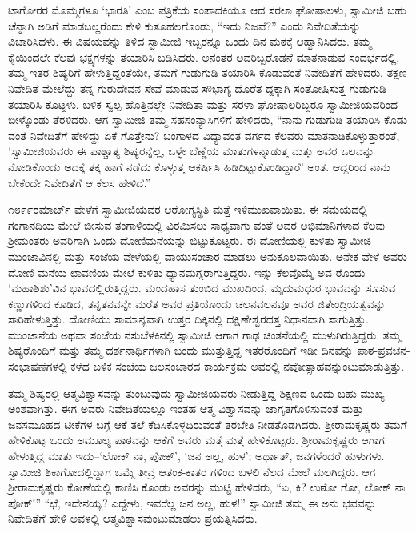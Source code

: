 ಟಾಗೋರರ ಮೊಮ್ಮಗಳೂ ‘ಭಾರತಿ’ ಎಂಬ ಪತ್ರಿಕೆಯ ಸಂಪಾದಕಿಯೂ ಆದ ಸರಲಾ ಘೋಷಾಲಳು, ಸ್ವಾಮೀಜಿ ಬಹು ಚೆನ್ನಾಗಿ ಅಡಿಗೆ ಮಾಡಬಲ್ಲರೆಂದು ಕೇಳಿ ಕುತೂಹಲಗೊಂಡು, “ಇದು ನಿಜವೆ?” ಎಂದು ನಿವೇದಿತೆಯನ್ನು ವಿಚಾರಿಸಿದಳು. ಈ ವಿಷಯವನ್ನು ತಿಳಿದ ಸ್ವಾಮೀಜಿ ಇಬ್ಬರನ್ನೂ ಒಂದು ದಿನ ಮಠಕ್ಕೆ ಆಹ್ವಾನಿಸಿದರು. ತಮ್ಮ ಕೈಯಿಂದಲೇ ಕೆಲವು ಭಕ್ಷ್ಯಗಳನ್ನು ತಯಾರಿಸಿ ಬಡಿಸಿದರು. ಅನಂತರ ಅವರಿಬ್ಬರೊಡನೆ ಮಾತನಾಡುವ ಸಂದರ್ಭದಲ್ಲಿ, ತಮ್ಮ ಇತರ ಶಿಷ್ಯರಿಗೆ ಹೇಳುತ್ತಿದ್ದಂತೆಯೇ, ತಮಗೆ ಗುಡುಗುಡಿ ತಯಾರಿಸಿ ಕೊಡುವಂತೆ ನಿವೇದಿತೆಗೆ ಹೇಳಿದರು. ತಕ್ಷಣ ನಿವೇದಿತೆ ಮೇಲೆದ್ದು ತನ್ನ ಗುರುದೇವನ ಸೇವೆ ಮಾಡುವ ಸೌಭಾಗ್ಯ ದೊರೆತ ದ್ದಕ್ಕಾಗಿ ಸಂತೋಷಿಸುತ್ತ ಗುಡುಗುಡಿ ತಯಾರಿಸಿ ಕೊಟ್ಟಳು. ಬಳಿಕ ಸ್ವಲ್ಪ ಹೊತ್ತಿನಲ್ಲೇ ನಿವೇದಿತಾ ಮತ್ತು ಸರಳಾ ಘೋಷಾಲರಿಬ್ಬರೂ ಸ್ವಾಮೀಜಿಯವರಿಂದ ಬೀಳ್ಕೊಂಡು ತೆರಳಿದರು. ಆಗ ಸ್ವಾಮೀಜಿ ತಮ್ಮ ಸಹಸಂನ್ಯಾಸಿಗಳಿಗೆ ಹೇಳಿದರು, “ನಾನು ಗುಡುಗುಡಿ ತಯಾರಿಸಿ ಕೊಡು ವಂತೆ ನಿವೇದಿತೆಗೆ ಹೇಳಿದ್ದು ಏಕೆ ಗೊತ್ತೇನು? ಬಂಗಾಳದ ವಿದ್ಯಾವಂತ ವರ್ಗದ ಕೆಲವರು ಮಾತನಾಡಿಕೊಳ್ಳುತ್ತಾರಂತೆ, ‘ಸ್ವಾಮೀಜಿಯವರು ಈ ಪಾಶ್ಚಾತ್ಯ ಶಿಷ್ಯರನ್ನೆಲ್ಲ, ಒಳ್ಳೇ ಬೆಣ್ಣೆಯ ಮಾತುಗಳನ್ನಾಡುತ್ತ ಮತ್ತು ಅವರ ಒಲವನ್ನು ನೋಡಿಕೊಂಡು ಅದಕ್ಕೆ ತಕ್ಕ ಹಾಗೆ ನಡೆದು ಕೊಳ್ಳುತ್ತ ಆಕರ್ಷಿಸಿ ಹಿಡಿದಿಟ್ಟುಕೊಂಡಿದ್ದಾರೆ’ ಅಂತ. ಆದ್ದರಿಂದ ನಾನು ಬೇಕೆಂದೇ ನಿವೇದಿತೆಗೆ ಆ ಕೆಲಸ ಹೇಳಿದೆ.”

೧೮೯೯ರಮಾರ್ಚ್ ವೇಳೆಗೆ ಸ್ವಾಮೀಜಿಯವರ ಆರೋಗ್ಯಸ್ಥಿತಿ ಮತ್ತೆ ಇಳಿಮುಖವಾಯಿತು. ಈ ಸಮಯದಲ್ಲಿ ಗಂಗಾನದಿಯ ಮೇಲೆ ಬೀಸುವ ತಂಗಾಳಿಯಲ್ಲಿ ವಿರಮಿಸಲು ಸಾಧ್ಯವಾಗು ವಂತೆ ಅವರ ಅಭಿಮಾನಿಗಳಾದ ಕೆಲವು ಶ್ರೀಮಂತರು ಅವರಿಗಾಗಿ ಒಂದು ದೋಣಿಮನೆಯನ್ನು ಬಿಟ್ಟುಕೊಟ್ಟರು. ಈ ದೋಣಿಯಲ್ಲಿ ಕುಳಿತು ಸ್ವಾಮೀಜಿ ಮುಂಜಾವಿನಲ್ಲಿ ಮತ್ತು ಸಂಜೆಯ ವೇಳೆಯಲ್ಲಿ ವಾಯುಸಂಚಾರ ಮಾಡಲು ಅನುಕೂಲವಾಯಿತು. ಅನೇಕ ವೇಳೆ ಅವರು ದೋಣಿ ಮನೆಯ ಛಾವಣಿಯ ಮೇಲೆ ಕುಳಿತು ಧ್ಯಾನಮಗ್ನರಾಗುತ್ತಿದ್ದರು. ಇನ್ನು ಕೆಲವೊಮ್ಮೆ ಅವ ರೊಂದು ‘ಮಹಾಶಿಶು’ವಿನ ಭಾವದಲ್ಲಿರುತ್ತಿದ್ದರು. ಮಂದಹಾಸ ತುಂಬಿದ ಮುಖದಿಂದ, ಮೃದುಮಧುರ ಭಾವವನ್ನು ಸೂಸುವ ಕಣ್ಣುಗಳಿಂದ ಕೂಡಿದ, ತನ್ನತನವನ್ನೇ ಮರೆತ ಅವರ ಪ್ರತಿಯೊಂದು ಚಲನವಲನವೂ ಅವರ ಜಿತೇಂದ್ರಿಯತ್ವವನ್ನು ಸಾರಿಹೇಳುತ್ತಿತ್ತು. ದೋಣಿಯು ಸಾಮಾನ್ಯವಾಗಿ ಉತ್ತರ ದಿಕ್ಕಿನಲ್ಲಿ ದಕ್ಷಿಣೇಶ್ವರದತ್ತ ನಿಧಾನವಾಗಿ ಸಾಗುತ್ತಿತ್ತು. ಮುಂಜಾನೆಯ ಅಥವಾ ಸಂಜೆಯ ನಸುಬೆಳಕಿನಲ್ಲಿ ಸ್ವಾಮೀಜಿ ಆಗಾಗ ಗಾಢ ಚಿಂತನೆಯಲ್ಲಿ ಮುಳುಗಿರುತ್ತಿದ್ದರು. ತಮ್ಮ ಶಿಷ್ಯರೊಂದಿಗೆ ಮತ್ತು ತಮ್ಮ ದರ್ಶನಾರ್ಥಿಗಳಾಗಿ ಬಂದು ಮುತ್ತುತ್ತಿದ್ದ ಇತರರೊಂದಿಗೆ ಇಡೀ ದಿನವನ್ನು ಪಾಠ-ಪ್ರವಚನ-ಸಂಭಾಷಣೆಗಳಲ್ಲಿ ಕಳೆದ ಬಳಿಕ ಸಂಜೆಯ ಜಲಸಂಚಾರದ ಕಾರ್ಯಕ್ರಮ ಅವರಲ್ಲಿ ನವೋತ್ಸಾಹವನ್ನುಂಟುಮಾಡುತ್ತಿತ್ತು.

ತಮ್ಮ ಶಿಷ್ಯರಲ್ಲಿ ಆತ್ಮವಿಶ್ವಾಸವನ್ನು ತುಂಬುವುದು ಸ್ವಾಮೀಜಿಯವರು ನೀಡುತ್ತಿದ್ದ ಶಿಕ್ಷಣದ ಒಂದು ಬಹು ಮುಖ್ಯ ಅಂಶವಾಗಿತ್ತು. ಈಗ ಅವರು ನಿವೇದಿತೆಯಲ್ಲೂ ಇಂತಹ ಆತ್ಮ ವಿಶ್ವಾಸವನ್ನು ಜಾಗೃತಗೊಳಿಸುವಂತೆ ಮತ್ತು ಜನಸಮೂಹದ ಟೀಕೆಗಳ ಬಗ್ಗೆ ಆಕೆ ತಲೆ ಕೆಡಿಸಿಕೊಳ್ಳದಿರುವಂತೆ ತರಬೇತಿ ನೀಡತೊಡಗಿದರು. ಶ್ರೀರಾಮಕೃಷ್ಣರು ತಮಗೆ ಹೇಳಿಕೊಟ್ಟ ಒಂದು ಅಮೂಲ್ಯ ಪಾಠವನ್ನು ಆಕೆಗೆ ಅವರು ಮತ್ತೆ ಮತ್ತೆ ಹೇಳಿಕೊಟ್ಟರು. ಶ್ರೀರಾಮಕೃಷ್ಣರು ಆಗಾಗ ಹೇಳುತ್ತಿದ್ದ ಮಾತು ಇದು–‘ಲೋಕ್ ನಾ, ಪೋಕ್​’, ‘ಜನ ಅಲ್ಲ, ಹುಳ’; ಅರ್ಥಾತ್, ಜನಗಳೆಂದರೆ ಹುಳುಗಳು. ಸ್ವಾಮೀಜಿ ಶಿಕಾಗೋದಲ್ಲಿದ್ದಾಗ ಒಮ್ಮೆ ತೀವ್ರ ಆತಂಕ-ಕಾತರ ಗಳಿಂದ ಬಳಲಿ ನೆಲದ ಮೇಲೆ ಮಲಗಿದ್ದರು. ಆಗ ಶ್ರೀರಾಮಕೃಷ್ಣರು ಕೋಣೆಯಲ್ಲಿ ಕಾಣಿಸಿ ಕೊಂಡು ಅವರನ್ನು ಮುಟ್ಟಿ ಹೇಳಿದರು, “ಏ, ಕಿ? ಉಠೋ ಗೋ, ಲೋಕ್ ನಾ ಪೋಕ್!” “ಛೆ, ಇದೇನಯ್ಯ? ಎದ್ದೇಳು, ಇವರೆಲ್ಲ ಜನ ಅಲ್ಲ, ಹುಳ!” ಸ್ವಾಮೀಜಿ ತಮ್ಮ ಈ ಅನು ಭವವನ್ನು ನಿವೇದಿತೆಗೆ ಹೇಳಿ ಅವಳಲ್ಲಿ ಆತ್ಮವಿಶ್ವಾಸವುಂಟುಮಾಡಲು ಪ್ರಯತ್ನಿಸಿದರು.

